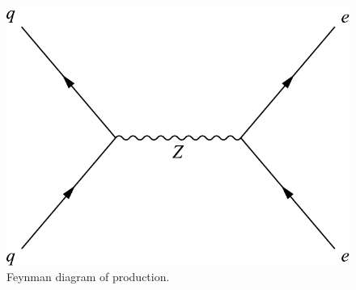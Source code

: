\begin{figure}[!htbp]
    \centering
    \includegraphics[width=\StackedPlotWidth]{figures/feyn_drell_yan_s_channel.pdf}
    \caption{
       Feynman diagram of \DrellYan \Ztoee production.
    }
    \label{fig:feyn_s_channel}
\end{figure}

